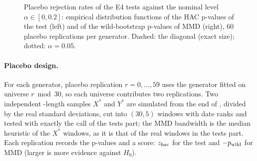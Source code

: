 \begin{table}[p]
  \centering
\end{table}

\begin{figure}[tbp]
  \centering
  \caption{Placebo rejection rates of the E4 tests against the nominal level $\alpha\in[0,0.2]$:
  empirical distribution functions of the HAC p-values of the \WC{} test (left) and of the
  wild-bootstrap p-values of MMD (right), 60 placebo replications per generator. Dashed: the
  diagonal (exact size); dotted: $\alpha=0.05$.}
  \label{fig:e4-placebo-size}
\end{figure}

\paragraph{Placebo design.}
For each generator, placebo replication $r=0,\dots,59$ uses the generator fitted on universe
$r\bmod30$, so each universe contributes two replications. Two independent \TEST{}-length samples
$X^*$ and $Y^*$ are simulated from the end of \TRAIN{}, divided by the real \TRAIN{} standard
deviations, cut into $(30,5)$ windows with \TEST{} date ranks and tested with exactly the call of
the tests part; the MMD bandwidth is the median heuristic of the $X^*$ windows, as it is that of
the real \TEST{} windows in the tests part. Each replication records the p-values and a score:
$z_{\mathrm{hac}}$ for the \WC{} test and $-p_{\mathrm{wild}}$ for MMD (larger is more evidence against $H_0$).

